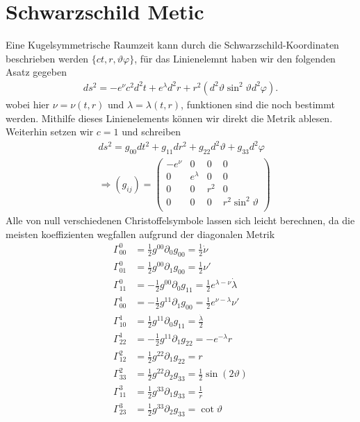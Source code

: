\documentclass[a4paper]{article}
\begin{document}
\section{Schwarzschild Metic}
Eine Kugelsymmetrische Raumzeit kann durch die Schwarzschild-Koordinaten
beschrieben werden $\{ct, r, \vartheta \varphi\}$, für das Linienelemnt haben
wir den folgenden Asatz gegeben
\begin{align}
    ds^2 = -e^\nu c^2 d^2t + e^\lambda d^2r + r^2(d^2\vartheta
    \sin^2\vartheta d^2\varphi).
\end{align}
wobei hier $\nu = \nu(t, r)$ und $\lambda = \lambda(t, r)$, funktionen sind
die noch bestimmt werden. Mithilfe dieses Linienelements
können wir direkt die Metrik ablesen. Weiterhin setzen wir $c=1$ und
schreiben
\begin{align}
    &ds^2 = g_{00} dt^2 + g_{11} dr^2 + g_{22} d^2\vartheta + g_{33}
    d^2\varphi
    \nonumber \\
    &\Rightarrow (g_{ij}) =
    \begin{pmatrix}
        -e^\nu & 0 & 0 & 0  \\
        0 & e^\lambda & 0 & 0  \\
        0 & 0 & r^2 & 0  \\
        0 & 0 & 0 & r^2\sin^2\vartheta  \\
    \end{pmatrix}
\end{align}
Alle von null verschiedenen Christoffelsymbole lassen sich leicht berechnen,
da die meisten koeffizienten wegfallen aufgrund der diagonalen Metrik
\begin{align}
    \Gamma^{0}_{00} &= \frac{1}{2} g^{00}\partial_0 g_{00} = \frac{1}{2}
    \dot{\nu}\\
    \Gamma^{0}_{01} &= \frac{1}{2} g^{00}\partial_1 g_{00} = \frac{1}{2}
    \nu'\\
    \Gamma^{0}_{11} &= -\frac{1}{2} g^{00}\partial_0 g_{11} = \frac{1}{2}
    e^{\lambda - \nu} \dot{\lambda}\\
    \Gamma^{1}_{00} &= -\frac{1}{2} g^{11}\partial_1 g_{00} = \frac{1}{2}
    e^{\nu -\lambda} \nu'\\
    \Gamma^{1}_{10} &= \frac{1}{2} g^{11}\partial_0 g_{11} =
    \frac{\dot{\lambda}}{2}\\
    \Gamma^1_{22} &= -\frac{1}{2} g^{11} \partial_1 g_{22} = -e^{-\lambda}
    r\\
    \Gamma^{2}_{12} &= \frac{1}{2} g^{22} \partial_1 g_{22} = r\\
    \Gamma^{2}_{33} &= \frac{1}{2} g^{22} \partial_2 g_{33} =
    \frac{1}{2}\sin(2\vartheta)\\
    \Gamma^{3}_{11} &= \frac{1}{2} g^{33} \partial_1 g_{33} = \frac{1}{r}\\
    \Gamma^{3}_{23} &= \frac{1}{2} g^{33}\partial_2 g_{33} = \cot\vartheta
\end{align}
\end{document}
